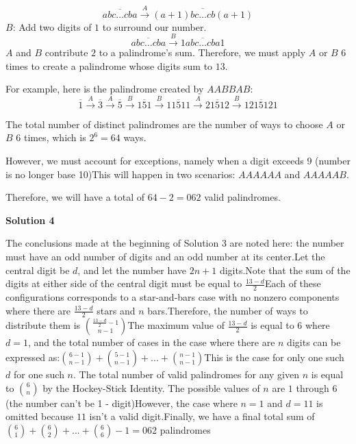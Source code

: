 \begin{enumerate}
 
 \[\overline{abc\dots cba} \stackrel{A}{\rightarrow}\overline{(a+1)bc\dots cb(a+1)}\]
$B$: Add two digits of $1$ to surround our number.
 \[\overline{abc\dots cba} \stackrel{B}{\rightarrow} \overline{1abc\dots cba1}\]
$A$ and $B$ contribute $2$ to a palindrome's sum. Therefore, we must apply $A$ or $B$ $6$ times to create a palindrome whose digits sum to $13$.

 For example, here is the palindrome created by $AABBAB$:
 \[\overline{1} \stackrel{A}{\rightarrow} \overline{3} \stackrel{A}{\rightarrow} \overline{5} \stackrel{B}{\rightarrow} \overline{151} \stackrel{B}{\rightarrow} \overline{11511}\stackrel{A}{\rightarrow} \overline{21512} \stackrel{B}{\rightarrow} \overline{1215121}\]

 The total number of distinct palindromes are the number of ways to choose $A$ or $B$ $6$ times, which is $2^6 = 64$ ways.

 However, we must account for exceptions, namely when a digit exceeds $9$ (number is no longer base 10)This will happen in two scenarios: $AAAAAA$ and $AAAAAB$.

 Therefore, we will have a total of $64-2 = \boxed{062}$ valid palindromes.

 



\textbf{Solution 4}

The conclusions made at the beginning of Solution 3 are noted here: the number must have an odd number of digits and an odd number at its center.Let the central digit be $d$, and let the number have $2n + 1$ digits.Note that the sum of the digits at either side of the central digit must be equal to $\frac{13 - d}{2}$Each of these configurations corresponds to a star-and-bars case with no nonzero components where there are $\frac{13 - d}{2}$ stars and $n$ bars.Therefore, the number of ways to distribute them is ${\frac{13-d}{2} - 1 \choose n - 1}$The maximum value of $\frac{13-d}{2}$ is equal to $6$ where $d=1$, and the total number of cases in the case where there are $n$ digits can be expressed as:${6 - 1 \choose n - 1} + {5 - 1 \choose n - 1} + ... + {n - 1 \choose n - 1}$This is the case for only one such $d$ for one such $n$. The total number of valid palindromes for any given $n$ is equal to ${6 \choose n}$ by the Hockey-Stick Identity. The possible values of $n$ are $1$ through $6$ (the number can't be 1 - digit)However, the case where $n = 1$ and $d = 11$ is omitted because $11$ isn't a valid digit.Finally, we have a final total sum of ${6 \choose 1} +{6 \choose 2} + ... + {6 \choose 6} - 1 = \boxed{062}$ palindromes


\end{enumerate}

